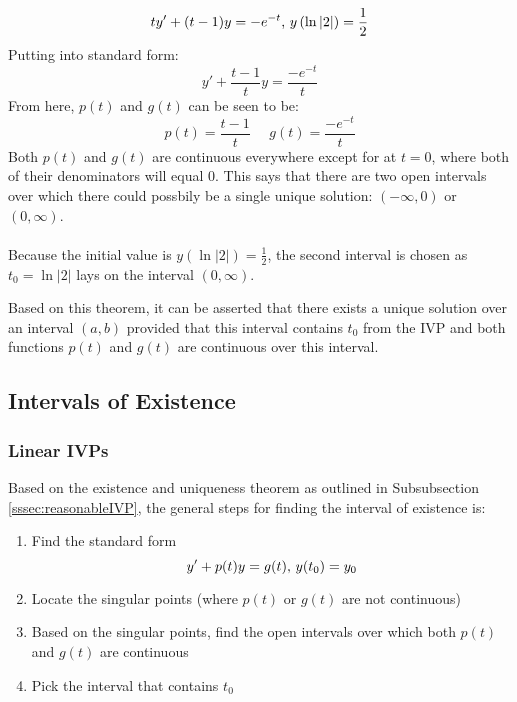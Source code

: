 \documentclass[12pt]{article}
\begin{document}
\begin{example}
  \begin{equation*}
    ty'+(t-1)y = -e^{-t}\textup{,}\ y\left(\ln|2|\right) = \frac{1}{2}
  \end{equation*}
  Putting into standard form:
  \begin{equation*}
    y'+ \frac{t-1}{t}y = \frac{-e^{-t}}{t}
  \end{equation*}
  From here, $p(t)$ and $g(t)$ can be seen to be:
  \begin{equation*}
    p(t) = \frac{t-1}{t}\ \ \ \ \ \ g(t) = \frac{-e^{-t}}{t}
  \end{equation*}
  Both $p(t)$ and $g(t)$ are continuous everywhere except for at $t=0$, where both of their denominators will equal $0$. This says that there are two open intervals over which there could possbily be a single unique solution: $(-\infty,0)$ or $(0,\infty)$.
\\ \\
  Because the initial value is $y\left(\ln|2|\right) = \frac{1}{2}$, the second interval is chosen as $t_0=\ln|2|$ lays on the interval $(0,\infty)$.
\end{example}
Based on this theorem, it can be asserted that there exists a unique solution over an interval $(a,b)$ provided that this interval contains $t_0$ from the IVP and both functions $p(t)$ and $g(t)$ are continuous over this interval.

\subsection{Intervals of Existence}
\label{ssec:intervalsOfExistence}

\subsubsection{Linear IVPs}
\label{sssec:linearIVPs}

Based on the existence and uniqueness theorem as outlined in Subsubsection \ref{sssec:reasonableIVP}, the general steps for finding the interval of existence is:
\begin{enumerate}
  \itemsep0em
  \item Find the standard form
    \begin{equation*}
      y'+p(t)y = g(t)\textup{,}\ y(t_0) = y_0
    \end{equation*}
  \item Locate the singular points (where $p(t)$ or $g(t)$ are not continuous)
  \item Based on the singular points, find the open intervals over which both $p(t)$ and $g(t)$ are continuous
  \item Pick the interval that contains $t_0$
\end{enumerate}
\end{document}
